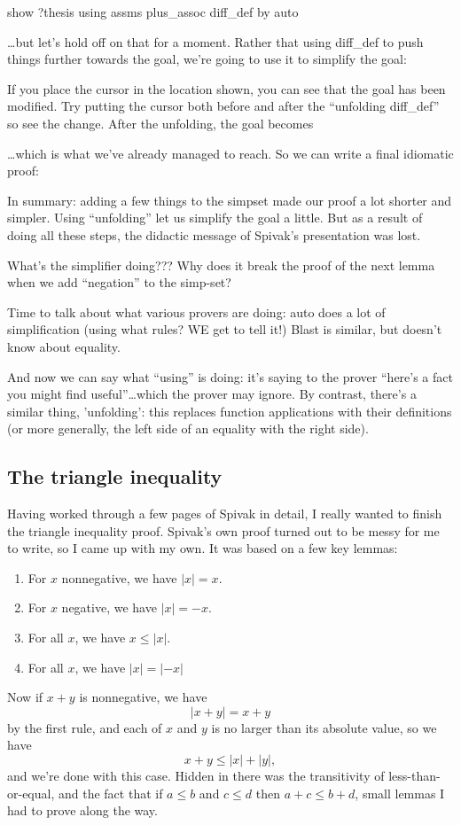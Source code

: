  show ?thesis using  assms plus_assoc  diff_def by auto

\ldots but let's hold off on that for a moment. Rather that using diff_def to push things further towards the goal, we're going to use it to simplify the goal:


If you place the cursor in the location shown, you can see that the goal has been modified. Try putting the cursor both before and after the ``unfolding diff_def'' so see the change. After the unfolding, the goal becomes 

\ldots which is what we've already managed to reach. So we can write a final idiomatic proof:


In summary: adding a few things to the simpset made our proof a lot shorter and simpler. Using ``unfolding'' let us simplify the goal a little. But as a result of doing all these steps, the didactic message of Spivak's presentation was lost. 


What's the simplifier doing???
Why does it break the proof of the next lemma when we add ``negation'' to the simp-set? 

Time to talk about what various provers are doing: auto does a lot of simplification (using what rules? WE get to tell it!) Blast is similar, but doesn't know about equality. 

And now we can say what ``using'' is doing: it's saying to the prover ``here's a fact you might find useful''\ldots which the prover may ignore. By contrast, there's a similar thing, 'unfolding': this replaces function applications with their definitions (or more generally, the left side of an equality with the right side). 

\subsection{The triangle inequality}
Having worked through a few pages of Spivak in detail, I really wanted to finish the triangle inequality proof. Spivak's own proof turned out to be messy for me to write, so I came up with my own. It was based on a few key lemmas: 
\begin{enumerate}
    \item For $x$ nonnegative, we have $|x| = x$.
    \item For $x$ negative, we have $|x| = -x$.
    \item For all $x$, we have $x \le |x|$.
    \item For all $x$, we have $|x| = |-x|$
\end{enumerate}
Now if $x+y$ is nonnegative, we have
$$
|x+y| = x + y
$$
by the first rule, and each of $x$ and $y$ is no larger than its absolute value, so we have $$
x + y \le |x| + |y|,$$
and we're done with this case. Hidden in there was the transitivity of less-than-or-equal, and the fact that if $a \le b$ and $c \le d$ then $a + c \le b + d$, small lemmas I had to prove along the way. 

